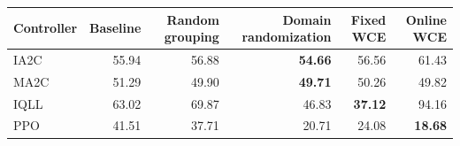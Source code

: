 \begin{tabular}{lrrrrr}
\hline
Controller & Baseline & Random grouping & Domain randomization & Fixed WCE & Online WCE \\
\hline
IA2C & 55.94 & 56.88 & \textbf{54.66} & 56.56 & 61.43 \\
MA2C & 51.29 & 49.90 & \textbf{49.71} & 50.26 & 49.82 \\
IQLL & 63.02 & 69.87 & 46.83 & \textbf{37.12} & 94.16 \\
PPO & 41.51 & 37.71 & 20.71 & 24.08 & \textbf{18.68} \\
\hline
\end{tabular}
